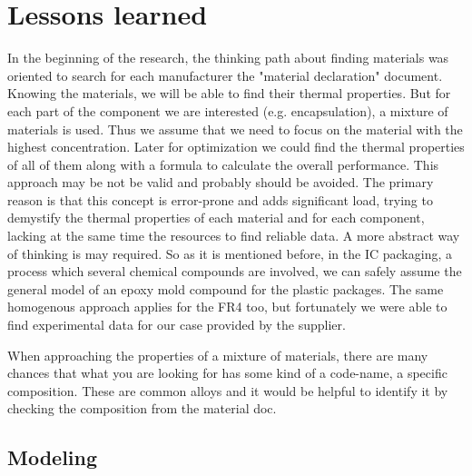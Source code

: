 \documentclass[final]{cubedoc}
\begin{document}
	
	
	\section{Lessons learned}\label{lessons_learned}
	
	In the beginning of the research, the thinking path about finding materials was oriented to search for each manufacturer the "material declaration" document. Knowing the materials, we will be able to find their thermal properties. But for each part of the component we are interested (e.g. encapsulation), a mixture of materials is used. Thus we assume that we need to focus on the material with the highest concentration. Later for optimization we could find the thermal properties of all of them along with a formula to calculate the overall performance. This approach may be not be valid and probably should be avoided. The primary reason is that this concept is error-prone and adds significant load, trying to demystify the thermal properties of each material and for each component, lacking at the same time the resources to find reliable data. A more abstract way of thinking is may required. So as it is mentioned before, in the IC packaging, a process which several chemical compounds are involved, we can safely assume the general model of an epoxy mold compound for the plastic packages. The same homogenous approach applies for the FR4 too, but fortunately we were able to find experimental data for our case provided by the supplier.
	
	
	When approaching the properties of a mixture of materials, there are many chances that what you are looking for has some kind of a code-name, a specific composition. These are common alloys and it would be helpful to identify it by checking the composition from the material doc. 
	
	
	\subsection{Modeling}
	\label{subsec:modeling}
	
\end{document}
